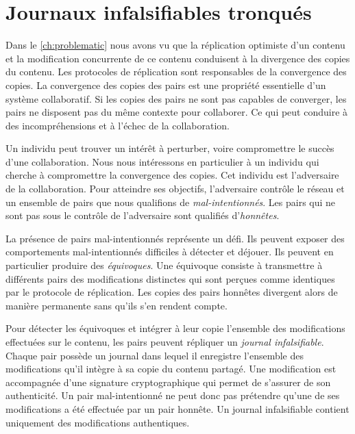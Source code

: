 
\chapter{Journaux infalsifiables tronqués}\label{ch:pruned-log}

\minitoc{}
\clearpage

Dans le \autoref{ch:problematic} nous avons vu que la réplication optimiste d'un contenu et la modification concurrente de ce contenu conduisent à la divergence des copies du contenu.
Les protocoles de réplication sont responsables de la convergence des copies.
La convergence des copies des pairs est une propriété essentielle d'un système collaboratif.
Si les copies des pairs ne sont pas capables de converger, les pairs ne disposent pas du même contexte pour collaborer.
Ce qui peut conduire à des incompréhensions et à l'échec de la collaboration.

Un individu peut trouver un intérêt à perturber, voire compromettre le succès d'une collaboration.
Nous nous intéressons en particulier à un individu qui cherche à compromettre la convergence des copies.
Cet individu est l'adversaire de la collaboration.
Pour atteindre ses objectifs, l'adversaire contrôle le réseau et un ensemble de pairs que nous qualifions de \emph{mal-intentionnés}.
Les pairs qui ne sont pas sous le contrôle de l'adversaire sont qualifiés d'\emph{honnêtes}.

La présence de pairs mal-intentionnés représente un défi.
Ils peuvent exposer des comportements mal-intentionnés difficiles à détecter et déjouer.
Ils peuvent en particulier produire des \emph{équivoques}.
Une équivoque consiste à transmettre à différents pairs des modifications distinctes qui sont perçues comme identiques par le protocole de réplication.
Les copies des pairs honnêtes divergent alors de manière permanente sans qu'ils s'en rendent compte.

Pour détecter les équivoques et intégrer à leur copie l'ensemble des modifications effectuées sur le contenu, les pairs peuvent répliquer un \emph{journal infalsifiable}.
Chaque pair possède un journal dans lequel il enregistre l'ensemble des modifications qu'il intègre à sa copie du contenu partagé.
Une modification est accompagnée d'une signature cryptographique qui permet de s'assurer de son authenticité.
Un pair mal-intentionné ne peut donc pas prétendre qu'une de ses modifications a été effectuée par un pair honnête.
Un journal infalsifiable contient uniquement des modifications authentiques.

